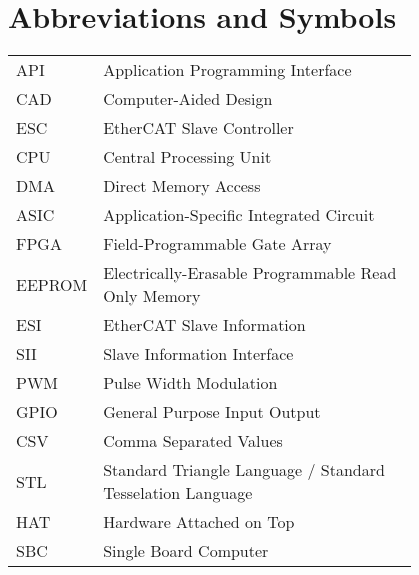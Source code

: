 \chapter*{Abbreviations and Symbols}

\begin{flushleft}
\begin{tabular}{l p{0.8\linewidth}}
API	& Application Programming Interface\\
CAD	& Computer-Aided Design\\
ESC	& EtherCAT Slave Controller\\
CPU	& Central Processing Unit\\
DMA	& Direct Memory Access\\
ASIC	& Application-Specific Integrated Circuit\\
FPGA	& Field-Programmable Gate Array\\
EEPROM	& Electrically-Erasable Programmable Read Only Memory\\
ESI	& EtherCAT Slave Information\\
SII	& Slave Information Interface\\
PWM	& Pulse Width Modulation\\
GPIO	& General Purpose Input Output\\
CSV	& Comma Separated Values\\
STL	& Standard Triangle Language / Standard Tesselation Language\\
HAT	& Hardware Attached on Top\\
SBC	& Single Board Computer\\
\end{tabular}
\end{flushleft}

